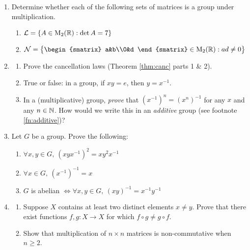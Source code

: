 \begin{exercises}
\begin{enumerate}
  
  \item Determine whether each of the following sets of matrices is a group under multiplication.\vspace{-6pt}
  \begin{enumerate}\itemsep2pt
    \item {} $\mathcal L=\{A\in \mathrm{M}_2(\mathbb{R}):\det A=7\}$\setcounter{enumii}{2}
    \item $\mathcal N=\bigl\{\begin{smatrix}
    a&b\\0&d
    \end{smatrix}\in\rM_2(\R):ad\neq 0\bigr\}$
  \end{enumerate}

  
  \item\begin{enumerate}\itemsep2pt
    \item Prove the cancellation laws (Theorem \ref{thm:canc} parts 1 \& 2).
    \item True or false: in a group, if $xy=e$, then $y=x^{-1}$.
    \item\label{exs:multinverse2} In a (multiplicative) group, \emph{prove} that $(x^{-1})^n=(x^n)^{-1}$ for any $x$ and any $n\in\mathbb{N}$. How would we write this in an \emph{additive} group (see footnote \ref{fn:additive})?
  \end{enumerate}
    
  \item Let $G$ be a group. Prove the following:\vspace{-6pt}
  \begin{enumerate}\itemsep2pt
    \item $\forall x,y\in G,\ (xy x^{-1})^2=xy^2x^{-1}$
    \item $\forall x\in G,\ (x^{-1})^{-1}=x$
    \item $G$ is abelian $\iff\forall x,y\in G,\ (xy)^{-1}=x^{-1}y^{-1}$
  \end{enumerate}
  
  
  \item\begin{enumerate}\itemsep2pt
	  \item\label{exs:funcnoncomm} Suppose $X$ contains at least two distinct elements $x\neq y$. Prove that there exist functions $f,g:X\to X$ for which $f\circ g\neq g\circ f$.
		\item Show that multiplication of $n\times n$ matrices is non-commutative when $n\ge 2$.
	\end{enumerate}
  

\end{enumerate}
\end{exercises}
